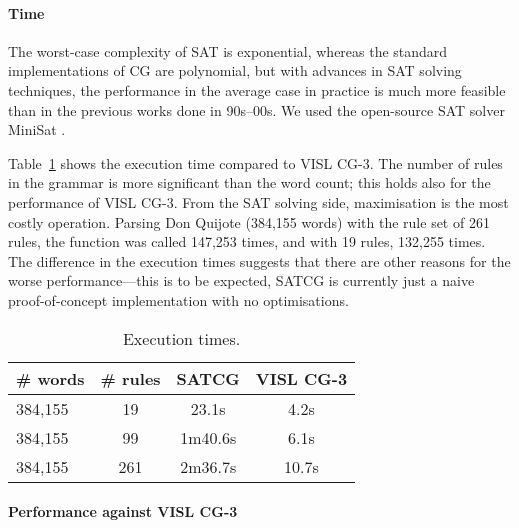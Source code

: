 \documentclass[11pt]{article}
\begin{document}
\paragraph{Time}

The worst-case complexity of SAT is exponential, whereas the standard
implementations of CG are polynomial, but with advances in SAT solving
techniques, the performance in the average case in practice is much more feasible than in the previous works done in 90s--00s.
We used the open-source SAT solver MiniSat \cite{een04sat}.

Table~\ref{table:time} shows the execution time compared to VISL CG-3. 
The number of rules in the grammar is more significant than the word
count; this holds also for the performance of VISL CG-3.
From the SAT solving side, maximisation is the most costly operation.
Parsing Don Quijote (384,155 words) with the rule set of 261 rules,
the function was called 147,253 times, and with 19 rules, 132,255 times.
The difference in the execution times suggests that there are other
reasons for the worse performance---this is to be expected,
SATCG is currently just a naive proof-of-concept implementation with no optimisations.

\begin{table}
  \centering
  \begin{tabular}{|l|c|c|c|}
     \hline
   \textbf{\# words} & \textbf{\# rules} &  \textbf{SATCG} & \textbf{VISL CG-3} \\ \hline
                384,155  & 19   &  23.1s   & 4.2s\\ %
	        384,155  & 99   &  1m40.6s & 6.1s \\ %
                384,155  & 261  &  2m36.7s & 10.7s \\ \hline
  \end{tabular}
  \caption{Execution times.}
  \label{table:time}
\end{table}

\paragraph{Performance against VISL CG-3}
\end{document}
